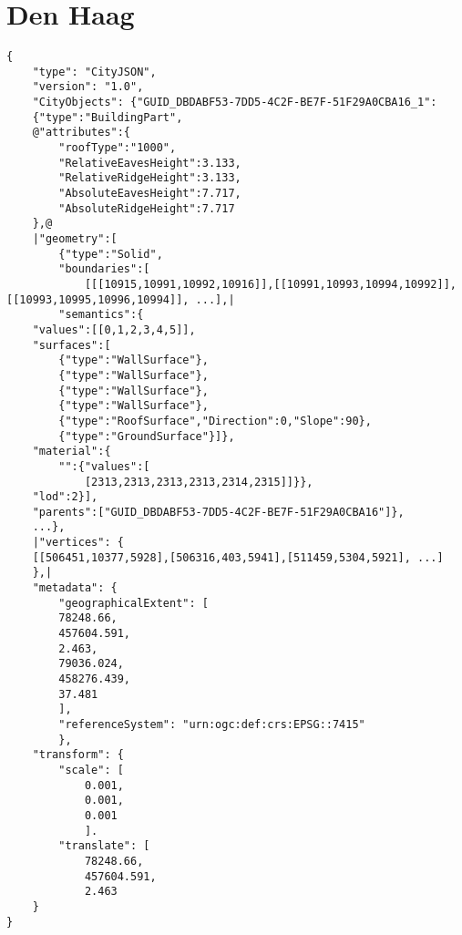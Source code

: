 \begin{scriptsize}
\begin{minipage}[c]{\linewidth / 1}
\end{minipage}
\end{scriptsize}



\section{Den Haag}

\begin{scriptsize}
\begin{minipage}[c]{\linewidth / 1}


\begin{lstlisting}[frame=single,style=base,caption={Snippet of Den Haag dataset}, label=dataset:denhaag]
{
    "type": "CityJSON",
    "version": "1.0",
    "CityObjects": {"GUID_DBDABF53-7DD5-4C2F-BE7F-51F29A0CBA16_1":
    {"type":"BuildingPart",
    @"attributes":{
        "roofType":"1000",
        "RelativeEavesHeight":3.133,
        "RelativeRidgeHeight":3.133,
        "AbsoluteEavesHeight":7.717,
        "AbsoluteRidgeHeight":7.717
    },@
    |"geometry":[
        {"type":"Solid",
        "boundaries":[
            [[[10915,10991,10992,10916]],[[10991,10993,10994,10992]],[[10993,10995,10996,10994]], ...],|
        "semantics":{
    "values":[[0,1,2,3,4,5]],
    "surfaces":[
        {"type":"WallSurface"},
        {"type":"WallSurface"},
        {"type":"WallSurface"},
        {"type":"WallSurface"},
        {"type":"RoofSurface","Direction":0,"Slope":90},
        {"type":"GroundSurface"}]},
    "material":{
        "":{"values":[
            [2313,2313,2313,2313,2314,2315]]}},
    "lod":2}],
    "parents":["GUID_DBDABF53-7DD5-4C2F-BE7F-51F29A0CBA16"]},
    ...},
    |"vertices": {
	[[506451,10377,5928],[506316,403,5941],[511459,5304,5921], ...]
    },|	
    "metadata": {
        "geographicalExtent": [	
        78248.66,
        457604.591,
        2.463,
        79036.024,
        458276.439,
        37.481
        ],	
        "referenceSystem": "urn:ogc:def:crs:EPSG::7415"	
        },	
    "transform": {	
        "scale": [	
            0.001,	
            0.001,	
            0.001	
            ].	
        "translate": [	
            78248.66,
            457604.591,
            2.463	
    }
}
\end{lstlisting}


\end{minipage}
\end{scriptsize}



